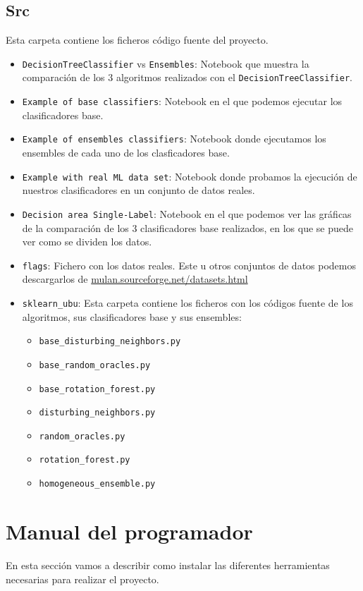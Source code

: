 \subsection{Src}
Esta carpeta contiene los ficheros código fuente del proyecto.
\begin{itemize}
	\item \texttt{DecisionTreeClassifier}  vs \texttt{Ensembles}: Notebook que muestra la comparación de los 3 algoritmos realizados con el \texttt{DecisionTreeClassifier}.
	\item \texttt{Example of base classifiers}: Notebook en el que podemos ejecutar los clasificadores base.
	\item \texttt{Example of ensembles classifiers}: Notebook donde ejecutamos los ensembles de cada uno de los clasficadores base.
	\item \texttt{Example with real ML data set}: Notebook donde probamos la ejecución de nuestros clasificadores en un conjunto de datos reales.
	\item \texttt{Decision area Single-Label}: Notebook en el que podemos ver las gráficas de la comparación de los 3 clasificadores base realizados, en los que se puede ver como se dividen los datos.
	\item \texttt{flags}: Fichero con los datos reales. Este u otros conjuntos de datos podemos descargarlos de \url{mulan.sourceforge.net/datasets.html}
	\item \texttt{sklearn\_ubu}: Esta carpeta contiene los ficheros  con los códigos fuente de los algoritmos, sus clasificadores base y sus ensembles:
	\begin{itemize}
		\item \texttt{base\_disturbing\_neighbors.py}
		\item \texttt{base\_random\_oracles.py}
		\item \texttt{base\_rotation\_forest.py}
		\item \texttt{disturbing\_neighbors.py}
		\item \texttt{random\_oracles.py}
		\item \texttt{rotation\_forest.py}
		\item \texttt{homogeneous\_ensemble.py}
	\end{itemize}
\end{itemize}

\section{Manual del programador}
En esta sección vamos a describir como instalar las diferentes herramientas necesarias para realizar el proyecto.

